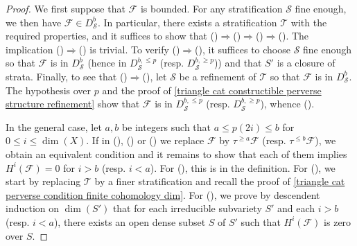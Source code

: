 \begin{proof}
We first suppose that $\mathscr{F}$ is bounded. For any stratification $\mathcal{S}$ fine enough, we then have $\mathscr{F}\in D^b_\mathcal{S}$. In particular, there exists a stratification $\mathcal{T}$ with the required properties, and it suffices to show that ()$\Rightarrow$()$\Rightarrow$()$\Rightarrow$(). The implication ()$\Rightarrow$() is trivial. To verify ()$\Rightarrow$(), it suffices to choose $\mathcal{S}$ fine enough so that $\mathscr{F}$ is in $D^b_\mathcal{S}$ (hence in $D_\mathcal{S}^{b,\leq p}$ (resp. $D_\mathcal{S}^{b,\geq p}$)) and that $S'$ is a closure of strata. Finally, to see that ()$\Rightarrow$(), let $\mathcal{S}$ be a refinement of $\mathcal{T}$ so that $\mathscr{F}$ is in $D_\mathcal{S}^b$. The hypothesis over $p$ and the proof of \cref{triangle cat constructible perverse structure refinement} show that $\mathscr{F}$ is in $D_\mathcal{S}^{b,\leq p}$ (resp. $D_\mathcal{S}^{b,\geq p}$), whence ().\par
In the general case, let $a,b$ be integers such that $a\leq p(2i)\leq b$ for $0\leq i\leq\dim(X)$. If in (), () or () we replace $\mathscr{F}$ by $\tau^{\geq a}\mathscr{F}$ (resp. $\tau^{\leq b}\mathscr{F}$), we obtain an equivalent condition and it remains to show that each of them implies $H^i(\mathscr{F})=0$ for $i>b$ (resp. $i<a$). For (), this is in the definition. For (), we start by replacing $\mathcal{T}$ by a finer stratification and recall the proof of \cref{triangle cat perverse condition finite cohomology dim}. For (), we prove by descendent induction on $\dim(S')$ that for each irreducible subvariety $S'$ and each $i>b$ (resp. $i<a$), there exists an open dense subset $S$ of $S'$ such that $H^i(\mathscr{F})$ is zero over $S$.
\end{proof}

